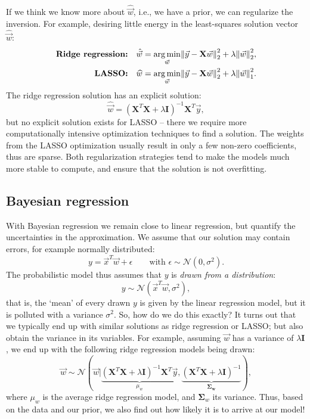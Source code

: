 \documentclass{article}
\DeclarePairedDelimiter\norm{\lVert}{\rVert}%
\DeclareMathOperator*{\argmin}{arg\,min}
\begin{document}
\begin{spexample}
    If we think we know more about $\hat{\vec{w}}$, i.e., we have a prior, we can regularize the inversion. For example, desiring little energy in the least-squares solution vector $\hat{\vec{w}}$:
    \begin{align}
        \textbf{Ridge regression:}\quad&\hat{\vec{w}} = \argmin_{\vec{w}} \norm*{\vec{y}-\mathbf{X}\vec{w}}_2^2 + \lambda\norm*{\vec{w}}_2^2,\\
        \textbf{LASSO:}\quad&\widehat{w} = \argmin_{\vec{w}} \norm*{\vec{y}-\mathbf{X}\vec{w}}_2^2 + \lambda\norm*{\vec{w}}_1^2.
    \end{align}
    The ridge regression solution has an explicit solution:
    \begin{equation}
        \hat{\vec{w}} = (\mathbf{X}^T\mathbf{X}+\lambda\mathbf{I})^{-1}\mathbf{X}^T\vec{y},
    \end{equation}
    but no explicit solution exists for LASSO -- there we require more computationally intensive optimization techniques to find a solution. The weights from the LASSO optimization usually result in only a few non-zero coefficients, thus are sparse. Both regularization strategies tend to make the models much more stable to compute, and ensure that the solution is not overfitting.
\end{spexample}

\subsection{Bayesian regression}
With Bayesian regression we remain close to linear regression, but quantify the uncertainties in the approximation. We assume that our solution may contain errors, for example normally distributed:
\begin{equation}
    y = \vec{x}^T\vec{w} + \epsilon\quad\quad\text{with }\epsilon \sim \mathcal{N}(0,\sigma^2).
\end{equation}
The probabilistic model thus assumes that $y$ is \textit{drawn from a distribution}:
\begin{equation}
    y \sim \mathcal{N}(\vec{x}^T\vec{w},\sigma^2),\label{eq:drawingy}
\end{equation}
that is, the `mean' of every drawn $y$ is given by the linear regression model, but it is polluted with a variance $\sigma^2$. So, how do we do this exactly? It turns out that we typically end up with similar solutions as ridge regression or LASSO; but also obtain the variance in its variables. For example, assuming $\vec{w}$ has a variance of $\lambda\mathbf{I}$, we end up with the following ridge regression models being drawn:
\begin{equation}
    \vec{w} \sim \mathcal{N}(\vec{w}|\underbrace{(\mathbf{X}^T\mathbf{X}+\lambda\mathbf{I})^{-1}\mathbf{X}^T\vec{y}}_{\mu_w},\underbrace{(\mathbf{X}^T\mathbf{X}+\lambda\mathbf{I})^{-1}}_{\bm{\Sigma_w}}),
\end{equation}
where $\mu_w$ is the average ridge regression model, and $\bm{\Sigma}_w$ its variance. Thus, based on the data and our prior, we also find out how likely it is to arrive at our model!
\end{document}
